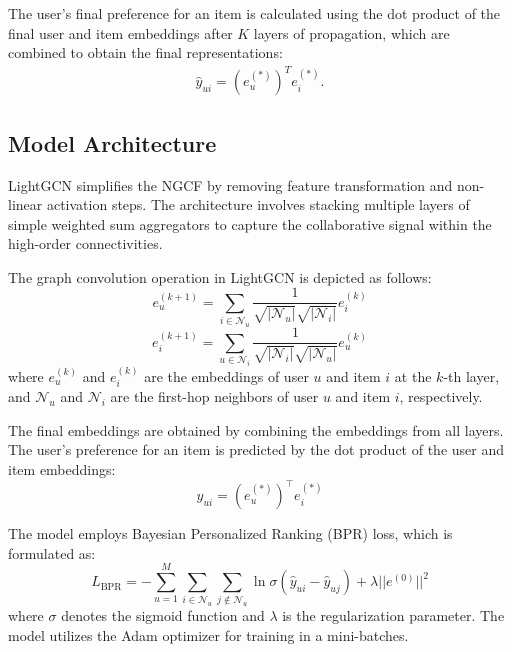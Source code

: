 \documentclass[12pt]{article}
\numberwithin{equation}{section}
\begin{document}
The user's final preference for an item is calculated using the dot product of the final user and item embeddings after $K$ layers of propagation, which are combined to obtain the final representations:
\begin{align*}
	\hat{y}_{ui} = (e_u^{(*)})^T e_i^{(*)}.
\end{align*}


\subsection{Model Architecture}

LightGCN simplifies the NGCF by removing feature transformation and non-linear activation steps. The architecture involves stacking multiple layers of simple weighted sum aggregators to capture the collaborative signal within the high-order connectivities.

The graph convolution operation in LightGCN is depicted as follows:
\begin{equation}
	e_u^{(k+1)} = \sum_{i \in \mathcal{N}_u} \frac{1}{\sqrt{|\mathcal{N}_u|}\sqrt{|\mathcal{N}_i|}} e_i^{(k)}
\end{equation}
\begin{equation}
	e_i^{(k+1)} = \sum_{u \in \mathcal{N}_i} \frac{1}{\sqrt{|\mathcal{N}_i|}\sqrt{|\mathcal{N}_u|}} e_u^{(k)}
\end{equation}
where $e_u^{(k)}$ and $e_i^{(k)}$ are the embeddings of user $u$ and item $i$ at the $k$-th layer, and $\mathcal{N}_u$ and $\mathcal{N}_i$ are the first-hop neighbors of user $u$ and item $i$, respectively.


The final embeddings are obtained by combining the embeddings from all layers. The user's preference for an item is predicted by the dot product of the user and item embeddings:
\begin{equation}
	\hat{y}_{ui} = (e_u^{(*)})^\top e_i^{(*)}
\end{equation}


The model employs Bayesian Personalized Ranking (BPR) loss, which is formulated as:
\begin{equation}
	L_{\text{BPR}} = -\sum_{u=1}^{M} \sum_{i \in \mathcal{N}_u} \sum_{j \notin \mathcal{N}_u} \ln \sigma(\hat{y}_{ui} - \hat{y}_{uj}) + \lambda ||e^{(0)}||^2
\end{equation}
where $\sigma$ denotes the sigmoid function and $\lambda$ is the regularization parameter. The model utilizes the Adam optimizer for training in a mini-batches.
\end{document}
